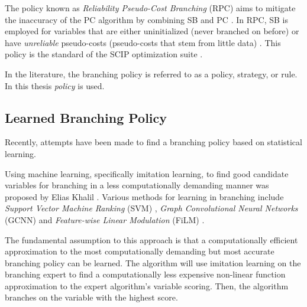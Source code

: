 The policy known as \textit{Reliability Pseudo-Cost Branching} (\gls{RPC}) aims to mitigate the inaccuracy of the \gls{PC} algorithm by combining \gls{SB} and \gls{PC} \cite{anand2017comparative}. In \gls{RPC}, \gls{SB} is employed for variables that are either uninitialized (never branched on before) or have \textit{unreliable} pseudo-costs (pseudo-costs that stem from little data) \cite{achterberg2004branching}. This policy is the standard of the \gls{SCIP} optimization suite \cite{achterberg2009scip}. 

In the literature, the branching policy is referred to as a policy, strategy, or rule. In this thesis \textit{policy} is used.  








\subsection{Learned Branching Policy}

Recently, attempts have been made to find a branching policy based on statistical learning. 

Using machine learning, specifically imitation learning, to find good candidate variables for branching in a less computationally demanding manner was proposed by Elias Khalil \cite{khalil2016learning}. Various methods for learning in branching include \textit{ Support Vector Machine Ranking} (\Gls{SVM}) \cite{khalil2016learning}, \textit{Graph Convolutional Neural Networks} (\gls{GCNN}) \cite{gasse2019exact} and \textit{Feature-wise Linear Modulation} (\gls{FiLM}) \cite{gupta2020hybrid}.

The fundamental assumption to this approach is that a computationally efficient approximation to the most computationally demanding but most accurate branching policy can be learned. The algorithm will use imitation learning on the branching expert to find a computationally less expensive non-linear function approximation to the expert algorithm's variable scoring. Then, the algorithm branches on the variable with the highest score. 




